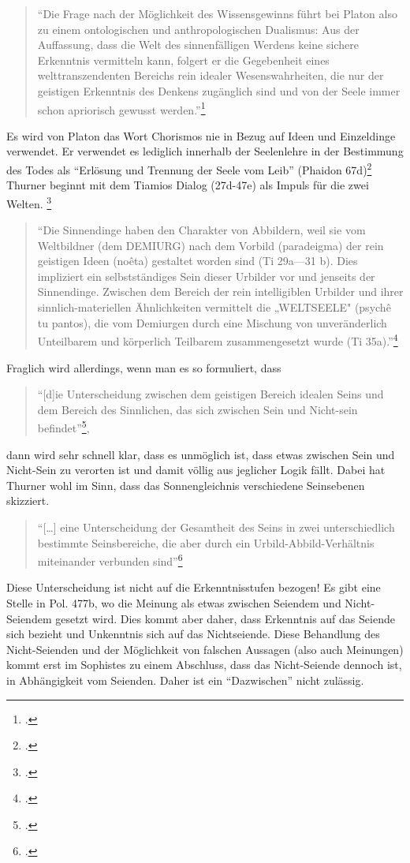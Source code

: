 \documentclass[12pt]{article}
\newcommand*{\zitatblock}[1]{%
    \begin{quote}
    \fontsize{10}{12}\selectfont
    \setlength{\parskip}{1.0em}
    #1
    \end{quote}
}
\begin{document}
\zitatblock{\enquote{Die Frage nach der Möglichkeit des Wissensgewinns führt bei Platon also zu einem ontologischen und anthropologischen Dualismus: Aus der Auffassung, dass die Welt des sinnenfälligen Werdens keine sichere Erkenntnis vermitteln kann, folgert er die Gegebenheit eines welttranszendenten Bereichs rein idealer Wesenswahrheiten, die nur der geistigen Erkenntnis des Denkens zugänglich sind und von der Seele immer schon apriorisch gewusst werden.}\footcite[][S. 99]{ThurnerDualismus}}
Es wird von Platon das Wort Chorismos nie in Bezug auf Ideen und Einzeldinge verwendet. Er verwendet es lediglich innerhalb der Seelenlehre in der Bestimmung des Todes als \enquote{Erlösung und Trennung der Seele vom Leib} (Phaidon 67d)\footcite[vgl.][S. 282]{ThurnerTrennung} 
Thurner beginnt mit dem Tiamios Dialog (27d-47e) als Impuls für die zwei Welten. \footcite[vgl.][S. 283]{ThurnerTrennung}
\zitatblock{\enquote{Die Sinnendinge haben den Charakter von Abbildern, weil sie vom Weltbildner (dem DEMIURG) nach dem Vorbild (paradeigma) der rein geistigen Ideen (noêta) gestaltet worden sind (Ti 29a—31 b). Dies impliziert ein selbstständiges Sein dieser Urbilder vor und jenseits der Sinnendinge. Zwischen dem Bereich der rein intelligiblen Urbilder und ihrer sinnlich-materiellen Ähnlichkeiten vermittelt die „WELTSEELE" (psychê tu pantos), die vom Demiurgen durch eine Mischung von unveränderlich Unteilbarem und körperlich Teilbarem zusammengesetzt wurde (Ti 35a).}\footcite[][S. 283]{ThurnerTrennung}}
Fraglich wird allerdings, wenn man es so formuliert, dass \zitatblock{\enquote{[d]ie Unterscheidung zwischen dem geistigen Bereich idealen Seins und dem Bereich des Sinnlichen, das sich zwischen Sein und Nicht-sein befindet}\footcite[vgl.][S. 283]{ThurnerTrennung},} dann wird sehr schnell klar, dass es unmöglich ist, dass etwas zwischen Sein und Nicht-Sein zu verorten ist und damit völlig aus jeglicher Logik fällt. Dabei hat Thurner wohl im Sinn, dass das Sonnengleichnis verschiedene Seinsebenen skizziert. \zitatblock{\enquote{[\dots] eine Unterscheidung der Gesamtheit des Seins in zwei unterschiedlich bestimmte Seinsbereiche, die aber durch ein Urbild-Abbild-Verhältnis miteinander verbunden sind}\footcite[vgl.][S. 284]{ThurnerTrennung}} Diese Unterscheidung ist nicht auf die Erkenntnisstufen bezogen!
Es gibt eine Stelle in Pol. 477b, wo die Meinung als etwas zwischen Seiendem und Nicht-Seiendem gesetzt wird. Dies kommt aber daher, dass Erkenntnis auf das Seiende sich bezieht und Unkenntnis sich auf das Nichtseiende. Diese Behandlung des Nicht-Seienden und der Möglichkeit von falschen Aussagen (also auch Meinungen) kommt erst im Sophistes zu einem Abschluss, dass das Nicht-Seiende dennoch ist, in Abhängigkeit vom Seienden. Daher ist ein \enquote{Dazwischen} nicht zulässig. 
\end{document}

